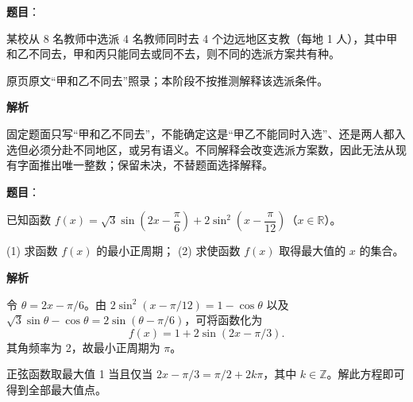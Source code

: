 \begin{answer}

\textbf{题目}：

某校从 8 名教师中选派 4 名教师同时去 4 个边远地区支教（每地 1 人），其中甲和乙不同去，甲和丙只能同去或同不去，则不同的选派方案共有\gkblank{}种。

\begin{gktip}
原页原文“甲和乙不同去”照录；本阶段不按推测解释该选派条件。
\end{gktip}

\textbf{解析}

固定题面只写“甲和乙不同去”，不能确定这是“甲乙不能同时入选”、还是两人都入选但必须分赴不同地区，或另有语义。不同解释会改变选派方案数，因此无法从现有字面推出唯一整数；保留未决，不替题面选择解释。


\end{answer}
\begin{answer}

\textbf{题目}：

已知函数 \(f(x)=\sqrt3\sin\left(2x-\dfrac\pi6\right)+2\sin^2\left(x-\dfrac\pi{12}\right)\)（\(x\in\mathbb R\)）。

(1) 求函数 \(f(x)\) 的最小正周期；
(2) 求使函数 \(f(x)\) 取得最大值的 \(x\) 的集合。

\textbf{解析}


令 \(\theta=2x-\pi/6\)。由 \(2\sin^2(x-\pi/12)=1-\cos\theta\) 以及
\(\sqrt3\sin\theta-\cos\theta=2\sin(\theta-\pi/6)\)，可将函数化为
\nopagebreak[4]
\[
f(x)=1+2\sin(2x-\pi/3).
\]
其角频率为 2，故最小正周期为 \(\pi\)。


正弦函数取最大值 1 当且仅当 \(2x-\pi/3=\pi/2+2k\pi\)，其中 \(k\in\mathbb Z\)。解此方程即可得到全部最大值点。



\end{answer}
